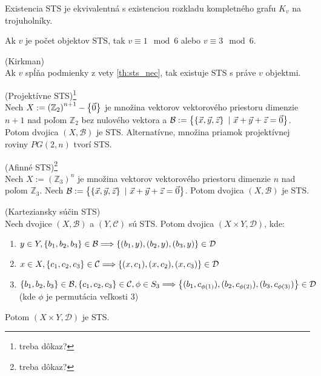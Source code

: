 \begin{remark}
Existencia STS je ekvivalentná s existenciou rozkladu kompletného grafu $K_v$ na trojuholníky.
\end{remark}

\begin{theorem}
\label{th:sts_nec}
Ak $v$ je počet objektov STS, tak $v \equiv 1 \mod 6$ alebo $v \equiv 3 \mod 6$.
\end{theorem}

\begin{theorem_hard}{(Kirkman)}\\
Ak $v$ spĺňa podmienky z vety \ref{th:sts_nec}, tak existuje STS s práve $v$ objektmi.
\end{theorem_hard}

\begin{theorem}{(Projektívne STS)\footnote{\TODO treba dôkaz?}}\\
Nech $X := \left(\mathbb{Z}_2\right)^{n+1} - \left\{\vec{0}\right\}$ je množina vektorov vektorového priestoru dimenzie $n+1$ nad poľom $\mathbb{Z}_2$ bez nulového vektora a 
$\mathcal{B} := \left\{\left\{\vec{x}, \vec{y}, \vec{z}\right\} ~|~ \vec{x} + \vec{y} + \vec{z} = \vec{0}\right\}$.
Potom dvojica $(X, \mathcal{B})$ je STS. Alternatívne, množina priamok projektívnej roviny $PG(2, n)$ tvorí STS.
\end{theorem}

\begin{theorem}{(Afinné STS)\footnote{\TODO treba dôkaz?}}\\
Nech $X := \left(\mathbb{Z}_3\right)^{n}$ je množina vektorov vektorového priestoru dimenzie $n$ nad poľom $\mathbb{Z}_3$. 
Nech $\mathcal{B} := \left\{\left\{\vec{x}, \vec{y}, \vec{z}\right\} ~|~ \vec{x} + \vec{y} + \vec{z} = \vec{0}\right\}$. Potom 
dvojica $(X, \mathcal{B})$ je STS.
\end{theorem}

\begin{theorem}{(Karteziansky súčin STS)}\\
Nech dvojice $(X, \mathcal{B})$ a $(Y, \mathcal{C})$ sú STS. Potom dvojica $(X \times Y, \mathcal{D})$, kde:
\begin{enumerate}
    \item $y \in Y, \left\{b_1, b_2, b_3\right\} \in \mathcal{B} \Longrightarrow \left\{(b_1, y), (b_2, y), (b_3, y)\right\} \in \mathcal{D}$
    \item $x \in X, \left\{c_1, c_2, c_3\right\} \in \mathcal{C} \Longrightarrow \left\{(x, c_1), (x, c_2), (x, c_3)\right\} \in \mathcal{D}$
    \item $\left\{b_1, b_2, b_3\right\} \in \mathcal{B}, \left\{c_1, c_2, c_3\right\} \in \mathcal{C}, \phi \in S_3 \Longrightarrow 
            \left\{(b_1, c_{\phi(1)}), (b_2, c_{\phi(2)}), (b_3, c_{\phi(3)})\right\} \in \mathcal{D}$ (kde $\phi$ je permutácia veľkosti $3$) 
\end{enumerate}

Potom $(X \times Y, \mathcal{D})$ je STS.
\end{theorem}


